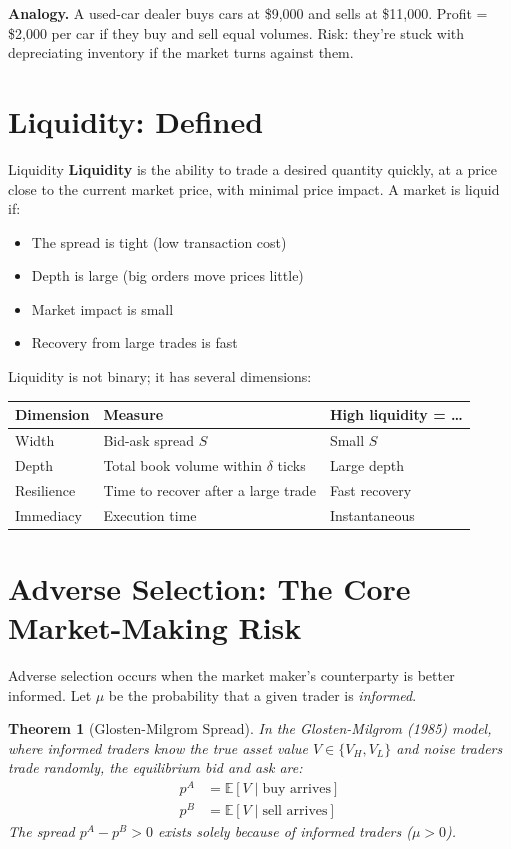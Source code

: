 \documentclass[12pt,a4paper,openany]{report}
\newtheorem{theorem}{Theorem}[chapter]
\theoremstyle{definition}
\newcommand{\E}{\mathbb{E}}
\begin{document}
\textbf{Analogy.} A used-car dealer buys cars at \$9,000 and sells at \$11,000. Profit = \$2,000 per car if they buy and sell equal volumes. Risk: they're stuck with depreciating inventory if the market turns against them.

\section{Liquidity: Defined}

\begin{definitionbox}{Liquidity}
\textbf{Liquidity} is the ability to trade a desired quantity quickly, at a price close to the current market price, with minimal price impact. A market is liquid if:
\begin{itemize}
  \item The spread is tight (low transaction cost)
  \item Depth is large (big orders move prices little)
  \item Market impact is small
  \item Recovery from large trades is fast
\end{itemize}
\end{definitionbox}

Liquidity is not binary; it has several dimensions:
\begin{center}
\begin{tabular}{lll}
\toprule
\textbf{Dimension} & \textbf{Measure} & \textbf{High liquidity = \ldots} \\
\midrule
Width & Bid-ask spread $S$ & Small $S$ \\
Depth & Total book volume within $\delta$ ticks & Large depth \\
Resilience & Time to recover after a large trade & Fast recovery \\
Immediacy & Execution time & Instantaneous \\
\bottomrule
\end{tabular}
\end{center}

\section{Adverse Selection: The Core Market-Making Risk}

Adverse selection occurs when the market maker's counterparty is better informed. Let $\mu$ be the probability that a given trader is \emph{informed}.

\begin{theorem}[Glosten-Milgrom Spread]
In the Glosten-Milgrom (1985) model, where informed traders know the true asset value $V \in \{V_H, V_L\}$ and noise traders trade randomly, the equilibrium bid and ask are:
\begin{align}
  p^A &= \E[V \mid \text{buy arrives}] \\
  p^B &= \E[V \mid \text{sell arrives}]
\end{align}
The spread $p^A - p^B > 0$ exists \emph{solely} because of informed traders ($\mu > 0$).
\end{theorem}
\end{document}
